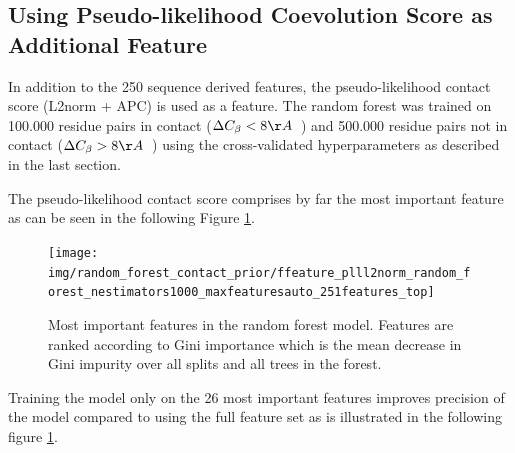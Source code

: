 \documentclass[12pt,a4paper,twoside]{book}
\newcommand{\Cb}{C_\beta}
\theoremstyle{definition}
\theoremstyle{definition}
\theoremstyle{remark}
\begin{document}
\subsection{Using Pseudo-likelihood Coevolution Score as Additional
Feature}\label{rf-with-pll-score}

In addition to the 250 sequence derived features, the pseudo-likelihood
contact score (L2norm + APC) is used as a feature. The random forest was
trained on 100.000 residue pairs in contact
(\(\Delta \Cb < 8 \AA \; \;\)) and 500.000 residue pairs not in contact
(\(\Delta \Cb > 8 \AA \; \;\)) using the cross-validated hyperparameters
as described in the last section.

The pseudo-likelihood contact score comprises by far the most important
feature as can be seen in the following Figure
\ref{fig:feature-importance-rf-with-pll-score}.






\begin{figure}

{\centering \texttt{[image: img/random\_forest\_contact\_prior/ffeature\_plll2norm\_random\_forest\_nestimators1000\_maxfeaturesauto\_251features\_top]} 

}

\caption{Most important
features in the random forest model. Features are ranked according to
Gini importance which is the mean decrease in Gini impurity over all
splits and all trees in the forest.}\label{fig:feature-importance-rf-with-pll-score}
\end{figure}

Training the model only on the 26 most important features improves
precision of the model compared to using the full feature set as is
illustrated in the following figure
\ref{fig:feature-importance-rf-with-pll-score}.
\end{document}
